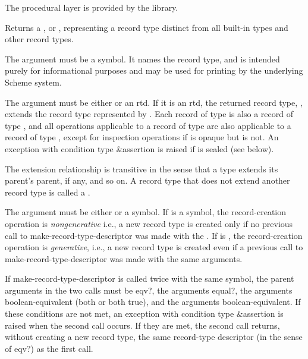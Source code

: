 The procedural layer is provided by the  library.

\begin{entry}{%
}
   
Returns a , or ,
representing a record type distinct from all built-in types and
other record types.

The  argument must be a symbol. It names the record type,
and is intended purely for informational purposes and may be used for printing by
the underlying Scheme system.

The  argument must be either \schfalse{} or an rtd. If it is an
rtd, the returned record type, , extends the record type
 represented by . Each record of type  is also a
record of type , and all operations applicable to a record of
type  are also applicable to a record of type , except for
inspection operations if  is opaque but  is not. An exception with
condition type {\cf\&assertion} is raised if  is sealed (see below).
   
The extension relationship is transitive in the sense that a type extends
its parent's parent, if any, and so on.  A record type that does not
extend another record type is called a .
   
The  argument must be either \schfalse{} or a symbol.
If  is a symbol, the record-creation operation is
\emph{nongenerative} i.e., a new record type is created only
if no previous call to {\cf make-record-type-descriptor}
was made with the .
If  is \schfalse{}, the record-creation operation is
\emph{generative}, i.e., a new record type is created even if
a previous call to {\cf make-record-type-descriptor} was
made with the same arguments.

If {\cf make-record-type-descriptor} is
called twice with the same  symbol, the parent
arguments in the two calls must be {\cf eqv?}, the 
arguments {\cf equal?}, the  arguments boolean-equivalent
(both \schfalse{} or both true), and the  arguments
boolean-equivalent.
If these conditions are not met, an exception with condition type
{\cf\&assertion} is raised when the second call occurs.
If they are met, the second call returns, without creating a new
record type, the same record-type descriptor
(in the sense of {\cf eqv?}) as the first call.


\end{entry}
